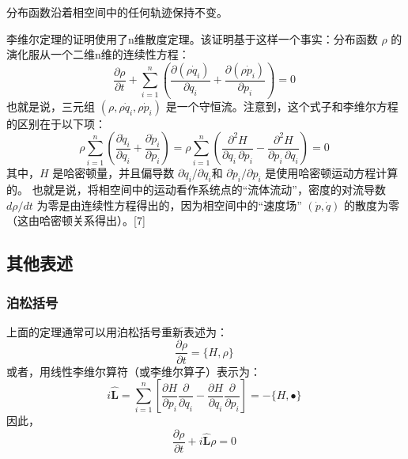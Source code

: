 分布函数沿着相空间中的任何轨迹保持不变。  

李维尔定理的证明使用了n维散度定理。该证明基于这样一个事实：分布函数 \(\rho\) 的演化服从一个二维n维的连续性方程：
\[
\frac{\partial \rho}{\partial t} + \sum_{i=1}^{n} \left( \frac{\partial (\rho \dot{q}_i)}{\partial q_i} + \frac{\partial (\rho \dot{p}_i)}{\partial p_i} \right) = 0~
\]
也就是说，三元组 \((\rho, \rho \dot{q}_i, \rho \dot{p}_i)\) 是一个守恒流。注意到，这个式子和李维尔方程的区别在于以下项：
\[
\rho \sum_{i=1}^{n} \left( \frac{\partial \dot{q}_i}{\partial q_i} + \frac{\partial \dot{p}_i}{\partial p_i} \right) = \rho \sum_{i=1}^{n} \left( \frac{\partial^2 H}{\partial q_i \, \partial p_i} - \frac{\partial^2 H}{\partial p_i \, \partial q_i} \right) = 0~
\]
其中，\( H \) 是哈密顿量，并且偏导数 \(\partial \dot{q}_i/\partial q_i\)和 \(\partial \dot{p}_i/\partial p_i\) 是使用哈密顿运动方程计算的。  
也就是说，将相空间中的运动看作系统点的“流体流动”，密度的对流导数 \(d\rho/dt\) 为零是由连续性方程得出的，因为相空间中的“速度场” \((\dot{p}, \dot{q})\) 的散度为零（这由哈密顿关系得出）。[7]
\subsection{其他表述}  
\subsubsection{泊松括号}  
上面的定理通常可以用泊松括号重新表述为：
\[
\frac{\partial \rho}{\partial t} = \{ H, \rho \}~
\]
或者，用线性李维尔算符（或李维尔算子）表示为：
\[
i \hat{\mathbf{L}} = \sum_{i=1}^{n} \left[ \frac{\partial H}{\partial p_i} \frac{\partial}{\partial q_i} - \frac{\partial H}{\partial q_i} \frac{\partial}{\partial p_i} \right] = -\{ H, \bullet \}~
\]
因此，
\[
\frac{\partial \rho}{\partial t} + i \hat{\mathbf{L}} \rho = 0~
\]